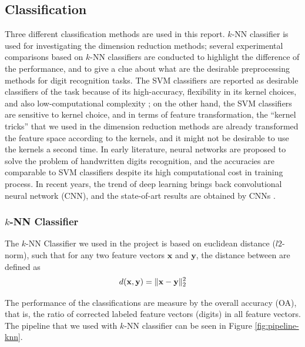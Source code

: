 \documentclass[12pt]{article}
\begin{document}
\subsection{Classification}
Three different classification methods are used in this report. $k$-NN\cite{altman1992introduction} classifier is used for investigating the dimension reduction methods; several experimental comparisons based on $k$-NN classifiers are conducted to highlight the difference of the performance, and to give a clue about what are the desirable preprocessing methods for digit recognition tasks. The SVM classifiers are reported as desirable classifiers of the task because of its high-accuracy, flexibility in its kernel choices, and also low-computational complexity \cite{soltanzadeh2004recognition, bottou1994comparison, liu2003handwritten}; on the other hand, the SVM classifiers are sensitive to kernel choice, and in terms of feature transformation, the ``kernel tricks'' that we used in the dimension reduction methods are already transformed the feature space according to the kernels, and it might not be desirable to use the kernels a second time. In early literature, neural networks are proposed to solve the problem of handwritten digits recognition, and the accuracies are comparable to SVM classifiers \cite{le1990handwritten, lecun1995comparison} despite its high computational cost in training process. In recent years, the trend of deep learning brings back convolutional neural network (CNN), and the state-of-art results are obtained by CNNs \cite{krizhevsky2012imagenet,cirecsan2011convolutional, ciresan2012multi}.

\subsubsection{$k$-NN Classifier}

The $k$-NN\cite{altman1992introduction} Classifier we used in the project is based on euclidean distance ($l2$-norm), such that for any two feature vectors $\mathbf{x}$ and $\mathbf{y}$, the distance between are defined as
\begin{equation}
	d({\bf x}, {\bf y}) = \|{\bf x} - {\bf y}\|_2^2
\end{equation}

The performance of the classifications are measure by the overall accuracy (OA), that is, the ratio of corrected labeled feature vectors (digits) in all feature vectors. The pipeline that we used with $k$-NN classifier can be seen in Figure \ref{fig:pipeline-knn}.
\end{document}
